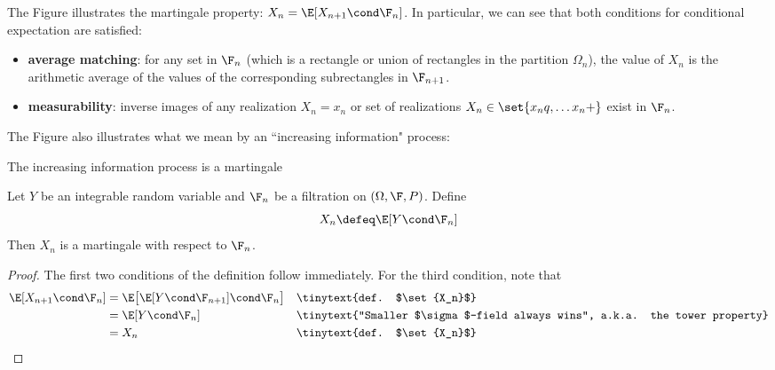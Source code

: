 \documentclass[10pt]{beamer}
\begin{document}
\begin{frame}

The Figure illustrates the martingale property: $X_n = \E[X_{n+1} \cond \F_n]$.  In particular, we can see that both conditions for conditional expectation  are satisfied:
%
\begin{itemize}
\item \textbf{average matching}: for any set in $\F_n$ (which is a rectangle or union of rectangles in the partition $\Omega_n$), the value of $X_n$ is the arithmetic average of the values of the corresponding subrectangles in $\F_{n+1}$.
\item \textbf{measurability}: inverse images of any realization $X_n = x_n$ or set of realizations $X_n \in  \set{x_n^^1, \hdots x_n^^k}$ exist in $\F_n$.
\end{itemize}

The Figure also illustrates what we mean by an ``increasing information" process:

	
\end{frame}

\begin{frame}{The increasing information process is a martingale}
\begin{proposition}
Let $Y$ be an integrable random variable and $\F_n$ be a filtration on $(\Omega, \F, P)$. 
Define
\[ X_n \defeq \E[Y \cond \F_n]\]
Then $X_n$ is a martingale with respect to $\F_n$.
\end{proposition}

\begin{proof}
The first two conditions of the definition follow immediately.  For the third condition, note that 
\begin{align*}
\E[X_{n+1} \cond \F_n] &= \E \big[ \E[Y \cond \F_{n+1}] \cond \F_n \big] && \tinytext{def. $\set{X_n}$} \\
&= \E[Y \cond \F_n] && \tinytext{``Smaller $\sigma$-field always wins", a.k.a. the tower property} \\
&= X_n && \tinytext{def. $\set{X_n}$}
\end{align*}	
\end{proof}
	
\end{frame}
\end{document}
